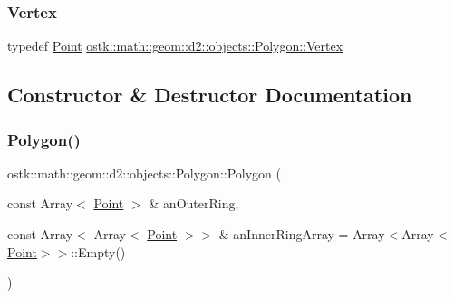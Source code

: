\mbox{\label{classostk_1_1math_1_1geom_1_1d2_1_1objects_1_1_polygon_a2fdf6254b42f087bd9cd0b8b0d7df91c}} 
\subsubsection{\texorpdfstring{Vertex}{Vertex}}
{\footnotesize\ttfamily typedef \hyperlink{classostk_1_1math_1_1geom_1_1d2_1_1objects_1_1_point}{Point} \hyperlink{classostk_1_1math_1_1geom_1_1d2_1_1objects_1_1_polygon_a2fdf6254b42f087bd9cd0b8b0d7df91c}{ostk\+::math\+::geom\+::d2\+::objects\+::\+Polygon\+::\+Vertex}}



\subsection{Constructor \& Destructor Documentation}
\mbox{\label{classostk_1_1math_1_1geom_1_1d2_1_1objects_1_1_polygon_adaf9ef564754ab10ed3dd0d5fa0d90ea}} 
\subsubsection{\texorpdfstring{Polygon()}{Polygon()}\hspace{0.1cm}{\footnotesize\ttfamily [1/3]}}
{\footnotesize\ttfamily ostk\+::math\+::geom\+::d2\+::objects\+::\+Polygon\+::\+Polygon (\begin{DoxyParamCaption}\item[{const Array$<$ \hyperlink{classostk_1_1math_1_1geom_1_1d2_1_1objects_1_1_point}{Point} $>$ \&}]{an\+Outer\+Ring,  }\item[{const Array$<$ Array$<$ \hyperlink{classostk_1_1math_1_1geom_1_1d2_1_1objects_1_1_point}{Point} $>$$>$ \&}]{an\+Inner\+Ring\+Array = {\ttfamily Array$<$Array$<$\hyperlink{classostk_1_1math_1_1geom_1_1d2_1_1objects_1_1_point}{Point}$>$$>$\+:\+:Empty()} }\end{DoxyParamCaption})}



